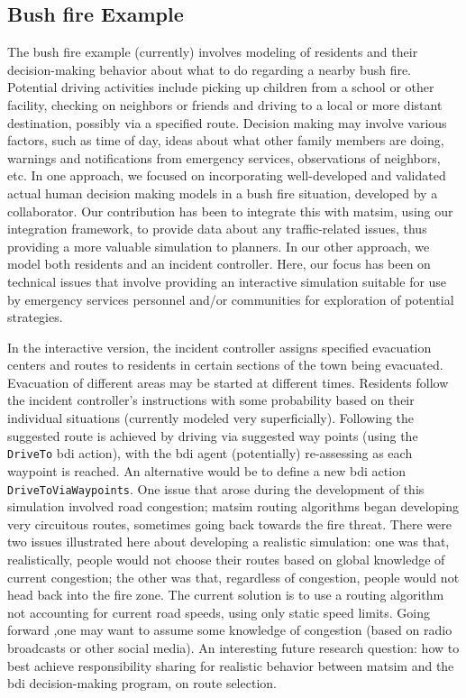 \subsection{Bush fire Example}
The bush fire example (currently) involves modeling of residents and
their decision-making behavior about what to do regarding a nearby
bush fire. Potential driving activities include picking up children
from a school or other facility, checking on neighbors or friends
and driving to a local or more distant destination, possibly via a
specified route. Decision making may involve various factors, such as
time of day, ideas about what other family members are doing,
warnings and notifications from emergency services, observations of
neighbors, etc. In one approach, we focused on incorporating
well-developed and validated actual human decision making models in
a bush fire situation, developed by a collaborator. Our contribution
has been to integrate this with \gls{matsim}, using our integration
framework, to provide data about any traffic-related issues, thus
providing a more valuable simulation to planners. In our other
approach, we model both residents and an incident
controller. Here, our focus has been on technical issues that involve
providing an interactive simulation suitable for use by emergency
services personnel and/or communities for exploration of potential
strategies. 

In the interactive version, the incident controller assigns specified
evacuation centers and routes to residents in certain sections of
the town being evacuated. Evacuation of different areas may be started
at different times. Residents follow the incident
controller's instructions with some probability based on their individual situations
(currently modeled very superficially). Following the suggested route
is achieved by driving via suggested way points  (using the \lstinline{DriveTo} \gls{bdi}
action), with the \gls{bdi} agent (potentially) re-assessing as each
waypoint is reached. An alternative would be to define a new \gls{bdi}
action \lstinline{DriveToViaWaypoints}. One issue that arose during the
development of this simulation involved road congestion;
\gls{matsim} routing algorithms began developing very circuitous routes,
sometimes going back towards the fire threat. There were two issues illustrated
here about developing a realistic simulation: one was that,
realistically, people would not choose their routes based on global
knowledge of current congestion; the other was that, regardless of
congestion, people would not head back into the fire zone. The current
solution is to use a routing algorithm not accounting for 
current road speeds, using only static speed limits. Going forward ,one
may want to assume some knowledge of congestion (based on radio
broadcasts or other social media). An interesting future research question: how to best
achieve responsibility sharing for realistic behavior between
\gls{matsim} and the \gls{bdi} decision-making program, on route
selection. 

